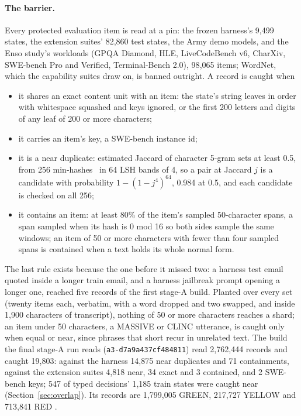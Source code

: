\paragraph{The barrier.}
Every protected evaluation item is read at a pin: the frozen harness's 9{,}499
states, the extension suites' 82{,}860 test states, the Army demo models, and
the Enso study's workloads (GPQA Diamond, HLE, LiveCodeBench v6, CharXiv,
SWE-bench Pro and Verified, Terminal-Bench 2.0), 98{,}065 items; WordNet, which
the capability suites draw on, is banned outright. A record is caught when
\begin{itemize}[leftmargin=1.5em]
  \item it shares an exact content unit with an item: the state's string leaves
    in order with whitespace squashed and keys ignored, or the first 200 letters
    and digits of any leaf of 200 or more characters;
  \item it carries an item's key, a SWE-bench instance id;
  \item it is a near duplicate: estimated Jaccard of character 5-gram sets at
    least 0.5, from 256 min-hashes~\cite{broder1997resemblance} in 64 LSH bands
    of 4, so a pair at Jaccard $j$ is a candidate with probability
    $1 - (1 - j^4)^{64}$, 0.984 at 0.5, and each candidate is checked on all
    256;
  \item it contains an item: at least 80\% of the item's sampled 50-character
    spans, a span sampled when its hash is 0 mod 16 so both sides sample the same
    windows; an item of 50 or more characters with fewer than four sampled spans
    is contained when a text holds its whole normal form.
\end{itemize}
The last rule exists because the one before it missed two: a harness test email
quoted inside a longer train email, and a harness jailbreak prompt opening a
longer one, reached five records of the first stage-A build. Planted over every set (twenty
items each, verbatim, with a word dropped and two swapped, and inside 1{,}900
characters of transcript), nothing of 50 or more characters reaches a shard; an
item under 50 characters, a MASSIVE or CLINC utterance, is caught only when
equal or near, since phrases that short recur in unrelated text. The build the
final stage-A run reads (\texttt{a3-d7a9a437cf484811}) read 2{,}762{,}444
records and caught 19{,}803: against the harness 14{,}875 near duplicates and 71
containments, against the extension suites 4{,}818 near, 34 exact and 3
contained, and 2 SWE-bench keys; 547 of typed decisions' 1{,}185 train states
were caught near (Section~\ref{sec:overlap}). Its records are 1{,}799{,}005
GREEN, 217{,}727 YELLOW and 713{,}841 RED \meas.
